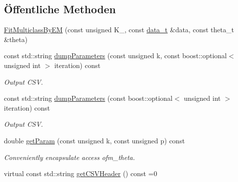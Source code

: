 \subsection*{Öffentliche Methoden}
\begin{DoxyCompactItemize}
\item 
\hyperlink{classCDA_1_1FitMulticlassByEM_a42ba3e452dfee55767219ab9571b0dd5}{FitMulticlassByEM} (const unsigned K\_\-, const \hyperlink{classCDA_1_1FitMulticlassByEM_a05aa6cf01041a71df27a4b8be40298ba}{data\_\-t} \&data, const theta\_\-t \&theta)
\item 
const std::string \hyperlink{classCDA_1_1FitMulticlassByEM_aa5598f1ced5c95045f59c99610ab53e5}{dumpParameters} (const unsigned k, const boost::optional$<$ unsigned int $>$ iteration) const 
\begin{DoxyCompactList}\small\item\em Output CSV. \item\end{DoxyCompactList}\item 
const std::string \hyperlink{classCDA_1_1FitMulticlassByEM_abd04a7135250a427a100c95bf2bf43a9}{dumpParameters} (const boost::optional$<$ unsigned int $>$ iteration) const 
\begin{DoxyCompactList}\small\item\em Output CSV. \item\end{DoxyCompactList}\item 
double \hyperlink{classCDA_1_1FitMulticlassByEM_a4185d0f323087ef9112e903a2782fdfd}{getParam} (const unsigned k, const unsigned p) const 
\begin{DoxyCompactList}\small\item\em Conveniently encapsulate access ofm\_\-theta. \item\end{DoxyCompactList}\item 
\hypertarget{classCDA_1_1FitMulticlassByEM_aec99fc55d806d855e02b9a2fc96887a0}{
virtual const std::string \hyperlink{classCDA_1_1FitMulticlassByEM_aec99fc55d806d855e02b9a2fc96887a0}{getCSVHeader} () const =0}
\label{classCDA_1_1FitMulticlassByEM_aec99fc55d806d855e02b9a2fc96887a0}


\end{DoxyCompactItemize}
